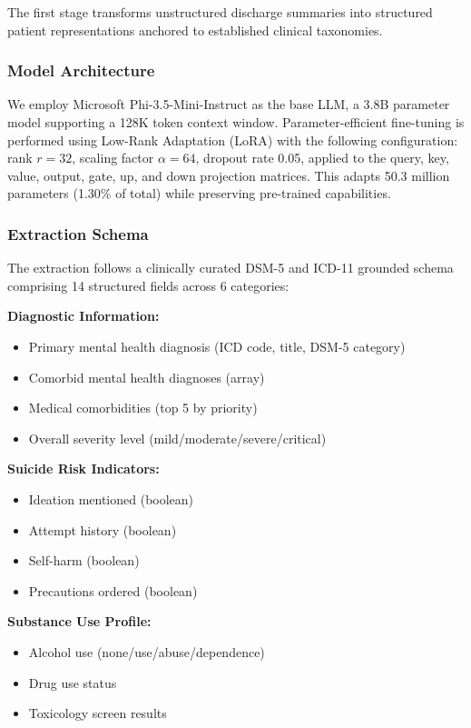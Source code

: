 \documentclass[conference]{IEEEtran}
\begin{document}
The first stage transforms unstructured discharge summaries into structured patient representations anchored to established clinical taxonomies.

\subsubsection{Model Architecture}
We employ Microsoft Phi-3.5-Mini-Instruct as the base LLM, a 3.8B parameter model supporting a 128K token context window. Parameter-efficient fine-tuning is performed using Low-Rank Adaptation (LoRA) \cite{b19} with the following configuration: rank $r = 32$, scaling factor $\alpha = 64$, dropout rate 0.05, applied to the query, key, value, output, gate, up, and down projection matrices. This adapts 50.3 million parameters (1.30\% of total) while preserving pre-trained capabilities.

\subsubsection{Extraction Schema}
The extraction follows a clinically curated DSM-5 and ICD-11 grounded schema comprising 14 structured fields across 6 categories:

\textbf{Diagnostic Information:}
\begin{itemize}
\item Primary mental health diagnosis (ICD code, title, DSM-5 category)
\item Comorbid mental health diagnoses (array)
\item Medical comorbidities (top 5 by priority)
\item Overall severity level (mild/moderate/severe/critical)
\end{itemize}

\textbf{Suicide Risk Indicators:}
\begin{itemize}
\item Ideation mentioned (boolean)
\item Attempt history (boolean)
\item Self-harm (boolean)
\item Precautions ordered (boolean)
\end{itemize}

\textbf{Substance Use Profile:}
\begin{itemize}
\item Alcohol use (none/use/abuse/dependence)
\item Drug use status
\item Toxicology screen results
\end{itemize}
\end{document}

